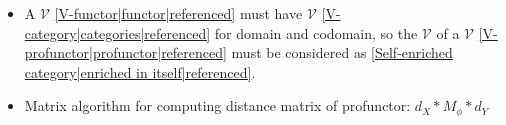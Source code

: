 \begin{itemize}
    \item  A $\mathcal{V}$ \ref{V-functor|functor|referenced} must have $\mathcal{V}$ \ref{V-category|categories|referenced} for domain and codomain, so the $\mathcal{V}$ of a $\mathcal{V}$ \ref{V-profunctor|profunctor|referenced} must be considered as \ref{Self-enriched category|enriched in itself|referenced}.
    \item Matrix algorithm for computing distance matrix of profunctor: $d_X * M_\phi * d_Y$
  \end{itemize}
